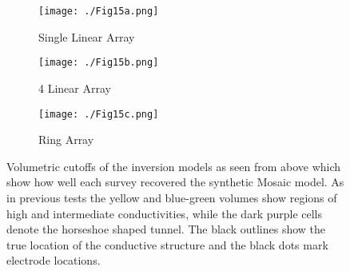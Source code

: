 \documentclass[preprint,authoryear,12pt]{elsarticle}
\begin{document}
\begin{figure}[htp]{}
   \begin{center}
      \begin{subfigure}{0.48\linewidth}
         \label{fig:SynthMosaic_Horseshoe_SingleLinear_Top}
         \texttt{[image: ./Fig15a.png]}
         \caption{Single Linear Array}
      \end{subfigure}
      \hspace{-0.7cm}
      \qquad
      \begin{subfigure}{0.48\linewidth}
         \label{fig:SynthMosaic_Horseshoe_4Linear_Top}
         \texttt{[image: ./Fig15b.png]}
         \caption{4 Linear Array}
      \end{subfigure}
      \vspace{0.2cm}

      \begin{subfigure}{0.48\linewidth}
         \label{fig:SynthMosaic_Horseshoe_Ring_Top}
         \texttt{[image: ./Fig15c.png]}
         \caption{Ring Array}
      \end{subfigure}
      \vspace{0.2cm}
   \end{center}
\vspace{-0.4cm}
\caption{Volumetric cutoffs of the inversion models as seen from above which show how well each survey recovered the synthetic Mosaic model. As in previous tests the yellow and blue-green volumes show regions of high and intermediate conductivities, while the dark purple cells denote the horseshoe shaped tunnel. The black outlines show the true location of the conductive structure and the black dots mark electrode locations.}
\label{fig:Horseshoe_SynthMosaic2_Isosurfaces_Top}
\end{figure}
\end{document}
